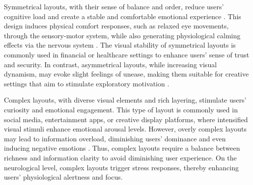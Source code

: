 Symmetrical layouts, with their sense of balance and order, reduce users’ cognitive load and create a stable and comfortable emotional experience \cite{makin2012implicit}. This design induces physical comfort responses, such as relaxed eye movements, through the sensory-motor system, while also generating physiological calming effects via the nervous system \cite{ledoux2000emotion}. The visual stability of symmetrical layouts is commonly used in financial or healthcare settings to enhance users’ sense of trust and security. In contrast, asymmetrical layouts, while increasing visual dynamism, may evoke slight feelings of unease, making them suitable for creative settings that aim to stimulate exploratory motivation \cite{carretie2019emomadrid}.

Complex layouts, with diverse visual elements and rich layering, stimulate users’ curiosity and emotional engagement. This type of layout is commonly used in social media, entertainment apps, or creative display platforms, where intensified visual stimuli enhance emotional arousal levels. However, overly complex layouts may lead to information overload, diminishing users’ dominance and even inducing negative emotions \cite{carretie2019emomadrid}. Thus, complex layouts require a balance between richness and information clarity to avoid diminishing user experience. On the neurological level, complex layouts trigger stress responses, thereby enhancing users’ physiological alertness and focus.

